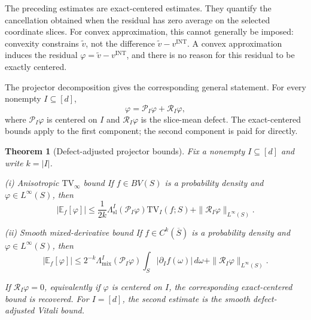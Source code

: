 \documentclass[11pt,letterpaper]{article}
\newtheorem{theorem}{Theorem}[section]
\theoremstyle{definition}
\theoremstyle{remark}
\newcommand{\INT}{\mathrm{INT}}
\newcommand{\TV}{\mathrm{TV}}
\begin{document}
The preceding estimates are exact-centered estimates. They quantify the
cancellation obtained when the residual has zero average on the selected
coordinate slices. For convex approximation, this cannot generally be imposed: convexity
constrains $\widetilde v$, not the difference $\widetilde v-v^{\INT}$. A
convex approximation induces the residual
$\varphi=\widetilde v-v^{\INT}$, and there is no reason for this residual to
be exactly centered.

The projector decomposition gives the corresponding general statement. For
every nonempty $I\subseteq[d]$,
$$
\varphi=\mathcal P_I\varphi+\mathcal R_I\varphi,
$$
where $\mathcal P_I\varphi$ is centered on $I$ and $\mathcal R_I\varphi$ is the
slice-mean defect. The exact-centered bounds apply to the first component; the
second component is paid for directly.

\begin{theorem}[Defect-adjusted projector bounds]
\label{thm:defect_adjusted_projector_bounds}
Fix a nonempty $I\subseteq[d]$ and write $k=|I|$.

\emph{(i) Anisotropic $\TV_\infty$ bound } 
If $f\in BV(S)$ is a probability density and
$\varphi\in L^\infty(S)$, then
\begin{equation}
\label{eq:defect_adjusted_tv_bound}
|\mathbb E_f[\varphi]|
\le
\frac{1}{2k}
\Lambda_{\mathrm{sl}}^I(\mathcal P_I\varphi)
\TV_I(f;S)
+
\|\mathcal R_I\varphi\|_{L^\infty(S)}.
\end{equation}

\emph{(ii) Smooth mixed-derivative bound } 
If $f\in C^k(\overline S)$ is a probability density and
$\varphi\in L^\infty(S)$, then
\begin{equation}
\label{eq:defect_adjusted_mixed_derivative_bound}
|\mathbb E_f[\varphi]|
\le
2^{-k}
\Lambda_{\mathrm{mix}}^I(\mathcal P_I\varphi)
\int_S|\partial_I f(\omega)|\,d\omega
+
\|\mathcal R_I\varphi\|_{L^\infty(S)}.
\end{equation}

If $\mathcal R_I\varphi=0$, equivalently if $\varphi$ is centered on $I$, the
corresponding exact-centered bound is recovered. For $I=[d]$, the second
estimate is the smooth defect-adjusted Vitali bound.
\end{theorem}
\end{document}
